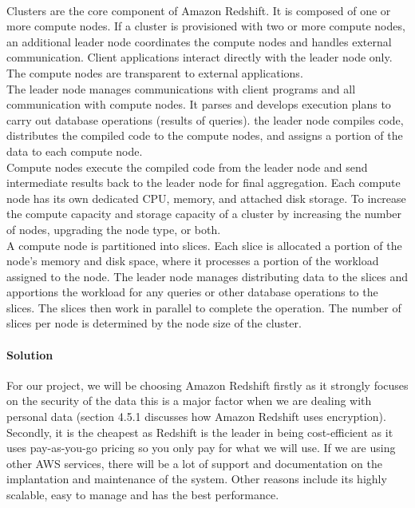 \documentclass[10pt]{article}
\begin{document}
\\Clusters are the core component of Amazon Redshift. It is composed of one or more compute nodes. If a cluster is provisioned with two or more compute nodes, an additional leader node coordinates the compute nodes and handles external communication. Client applications interact directly with the leader node only. The compute nodes are transparent to external applications.\\
The leader node manages communications with client programs and all communication with compute nodes. It parses and develops execution plans to carry out database operations (results of queries). the leader node compiles code, distributes the compiled code to the compute nodes, and assigns a portion of the data to each compute node.\\
Compute nodes execute the compiled code from the leader node and send intermediate results back to the leader node for final aggregation. Each compute node has its own dedicated CPU, memory, and attached disk storage. To increase the compute capacity and storage capacity of a cluster by increasing the number of nodes, upgrading the node type, or both.\\
A compute node is partitioned into slices. Each slice is allocated a portion of the node's memory and disk space, where it processes a portion of the workload assigned to the node. The leader node manages distributing data to the slices and apportions the workload for any queries or other database operations to the slices. The slices then work in parallel to complete the operation. The number of slices per node is determined by the node size of the cluster. 
\paragraph{Solution}For our project, we will be choosing Amazon Redshift firstly as it strongly focuses on the security of the data this is a major factor when we are dealing with personal data (section 4.5.1 discusses how Amazon Redshift uses encryption). Secondly, it is the cheapest as Redshift is the leader in being cost-efficient as it uses pay-as-you-go pricing so you only pay for what we will use. If we are using other AWS services, there will be a lot of support and documentation on the implantation and maintenance of the system. Other reasons include its highly scalable, easy to manage and has the best performance.\cite{redshift-benefits} 
\end{document}
